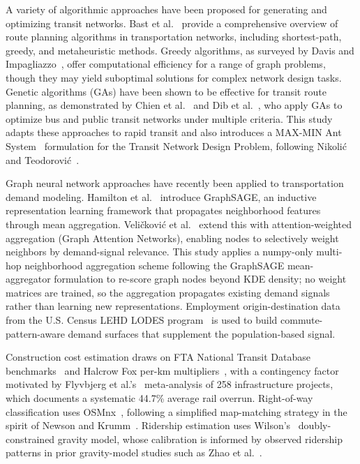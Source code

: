 \documentclass[sigconf,nonacm]{acmart}
\begin{document}
A variety of algorithmic approaches have been proposed for generating and optimizing transit networks. Bast et al.~\cite{bast2016route} provide a comprehensive overview of route planning algorithms in transportation networks, including shortest-path, greedy, and metaheuristic methods. Greedy algorithms, as surveyed by Davis and Impagliazzo~\cite{davis2007greedy}, offer computational efficiency for a range of graph problems, though they may yield suboptimal solutions for complex network design tasks. Genetic algorithms (GAs) have been shown to be effective for transit route planning, as demonstrated by Chien et al.~\cite{chien2001genetic} and Dib et al.~\cite{bib:dib2017ga}, who apply GAs to optimize bus and public transit networks under multiple criteria. This study adapts these approaches to rapid transit and also introduces a MAX-MIN Ant System~\cite{stutzle2000mmas} formulation for the Transit Network Design Problem, following Nikolić and Teodorović~\cite{nikolic2013aco}.

Graph neural network approaches have recently been applied to transportation demand modeling. Hamilton et al.~\cite{hamilton2017graphsage} introduce GraphSAGE, an inductive representation learning framework that propagates neighborhood features through mean aggregation. Veličković et al.~\cite{velickovic2018gat} extend this with attention-weighted aggregation (Graph Attention Networks), enabling nodes to selectively weight neighbors by demand-signal relevance. This study applies a numpy-only multi-hop neighborhood aggregation scheme following the GraphSAGE mean-aggregator formulation to re-score graph nodes beyond KDE density; no weight matrices are trained, so the aggregation propagates existing demand signals rather than learning new representations. Employment origin-destination data from the U.S. Census LEHD LODES program~\cite{lodes2023} is used to build commute-pattern-aware demand surfaces that supplement the population-based signal.

Construction cost estimation draws on FTA National Transit Database benchmarks~\cite{fta2023ntd} and Halcrow Fox per-km multipliers~\cite{halcrow2000cost}, with a contingency factor motivated by Flyvbjerg et al.'s~\cite{flyvbjerg2003overruns} meta-analysis of 258 infrastructure projects, which documents a systematic 44.7\% average rail overrun. Right-of-way classification uses OSMnx~\cite{boeing2017osmnx}, following a simplified map-matching strategy in the spirit of Newson and Krumm~\cite{newson2009mapmatching}. Ridership estimation uses Wilson's~\cite{wilson1971gravity} doubly-constrained gravity model, whose calibration is informed by observed ridership patterns in prior gravity-model studies such as Zhao et al.~\cite{zhao2022ridership}.
\end{document}
